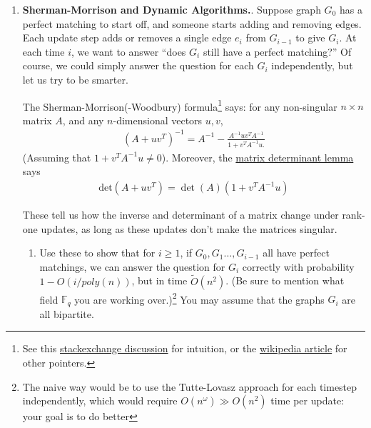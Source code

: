 \documentclass{article}
\theoremstyle{plain}
\newcommand\litem[1]{\item{\bfseries#1.\space}}
\begin{document}
\begin{enumerate}
\begin{enumerate}
  Observe that this algorithm is different from the one in class:
  there the prices went up in lock-step, here we just pick a single
  item and unilaterally raise its price by a tiny constant. We also
  don’t get a perfect matching here at the end, we have to do some
  correction (Step (A3)).  BTW, what can you say about the performance
  of such an algorithm when you have general weights?
\end{enumerate}
\litem{Sherman-Morrison and Dynamic Algorithms}. Suppose graph $G_0$ has a perfect matching
to start off, and someone starts adding and removing edges. Each update step adds or
removes a single edge $e_i$ from $G_{i−1}$ to give $G_i$. At each time $i$, we want to answer ``does $G_i$
still have a perfect matching?” Of course, we could simply answer the question for each $G_i$
independently, but let us try to be smarter.

The Sherman-Morrison(-Woodbury) formula\footnote{See this
  \href{https://math.stackexchange.com/questions/252367/insightful-proofs-for-sherman-morrison-formula-and-matrix-determinant-lemma}{stackexchange
    discussion} for intuition, or the
  \href{https://en.wikipedia.org/wiki/Sherman\%E2\%80\%93Morrison_formula}{wikipedia article} for other pointers.}  says: for any non-singular
$n\times n$ matrix $A$, and any $n$-dimensional vectors $u, v$,
\begin{align*}
  ( A + u v ^ { T } ) ^ { - 1} = A ^ { - 1} - \frac { A ^ { - 1} u v ^ { T } A ^ { - 1} } { 1+ v ^ { T } A ^ { - 1} u .}
\end{align*}
(Assuming that $1 + v^T A^{-1} u \neq 0$). Moreover, the
\href{http://en.wikipedia.org/wiki/Matrix_determinant_lemma}{matrix
  determinant lemma} says
\begin{align*}
\mathrm{det} ( A + u v ^ { T } ) = \operatorname{det} ( A ) ( 1+ v ^ { T } A ^ { - 1} u )
\end{align*}

These tell us how the inverse and determinant of a matrix change under rank-one updates,
as long as these updates don’t make the matrices singular.
\begin{enumerate}
\item Use these to show that for $i \geq 1$, if
  $G_0, G_1\ldots, G_{i-1}$ all have perfect matchings, we can answer
  the question for $G_i$ correctly with probability
  $1 − O(i/poly(n))$, but in time $\tilde{O}(n^2)$. (Be sure to
  mention what field $\mathbb{F}_q$ you are working
  over.)\footnote{The naive way would be to use the Tutte-Lovasz
    approach for each timestep independently, which would require
    $O(n^\omega) \gg O(n^2)$ time per update: your goal is to do
    better} You may assume that the graphs $G_i$ are all bipartite.


\end{enumerate}
\end{enumerate}
\end{document}
